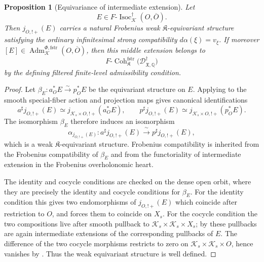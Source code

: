 \documentclass[10pt,a4paper]{amsart}
\newtheorem{proposition}{Proposition}
\newcommand{\Adm}{\operatorname{Adm}}
\newcommand{\Coh}{\operatorname{Coh}}
\newcommand{\Isoc}{\operatorname{Isoc}}
\newcommand{\fstr}{\mathrm{fstr}}
\begin{document}
\begin{proposition}[Equivariance of intermediate extension]
\label{prop:eq-intermediate-extension}
Let
\[
  E\in F\text{-}\Isoc^{\dagger}_{\mathcal K}(O,\overline O).
\]
Then \(j_{O,!+}(E)\) carries a natural Frobenius weak \(\mathfrak K\)-equivariant
structure satisfying the ordinary infinitesimal strong compatibility
\(d\alpha(\xi)=v_\xi\). If moreover
\([E]\in\Adm^{\Phi,\fstr}_{\mathcal K}(O,\overline O)\), then this middle
extension belongs to
\[
  F\text{-}\Coh^{\fstr}_{\mathfrak K}
  \bigl(\mathscr D^\dagger_{\mathfrak X,\mathbb Q}\bigr)
\]
by the defining filtered finite-level admissibility condition.
\end{proposition}

\begin{proof}
Let \(\beta_E:a_O^*E\xrightarrow{\sim}p_O^*E\) be the equivariant structure on
\(E\). Applying  to the smooth
special-fiber action and projection maps gives canonical identifications
\[
  a^\sharp j_{O,!+}(E)
  \simeq
  j_{\mathcal K_s\times O,!+}(a_O^*E),
  \qquad
  p^\sharp j_{O,!+}(E)
  \simeq
  j_{\mathcal K_s\times O,!+}(p_O^*E).
\]
The isomorphism \(\beta_E\) therefore induces an isomorphism
\[
  \alpha_{j_{O,!+}(E)}:
  a^\sharp j_{O,!+}(E)
  \xrightarrow{\;\sim\;}
  p^\sharp j_{O,!+}(E),
\]
which is a weak \(\mathfrak K\)-equivariant structure. Frobenius compatibility
is inherited from the Frobenius compatibility of \(\beta_E\) and from the
functoriality of intermediate extension in the Frobenius overholonomic heart.

The identity and cocycle conditions are checked on the dense open orbit, where
they are precisely the identity and cocycle conditions for \(\beta_E\). For the
identity condition this gives two endomorphisms of \(j_{O,!+}(E)\) which
coincide after restriction to \(O\), and
 forces them to coincide
on \(X_s\). For the cocycle condition the two compositions live after smooth
pullback to \(\mathcal K_s\times\mathcal K_s\times X_s\); by
 these pullbacks are again
intermediate extensions of the corresponding pullbacks of \(E\). The difference
of the two cocycle morphisms restricts to zero on
\(\mathcal K_s\times\mathcal K_s\times O\), hence vanishes by
. Thus the weak equivariant
structure is well defined.


\end{proof}
\end{document}

